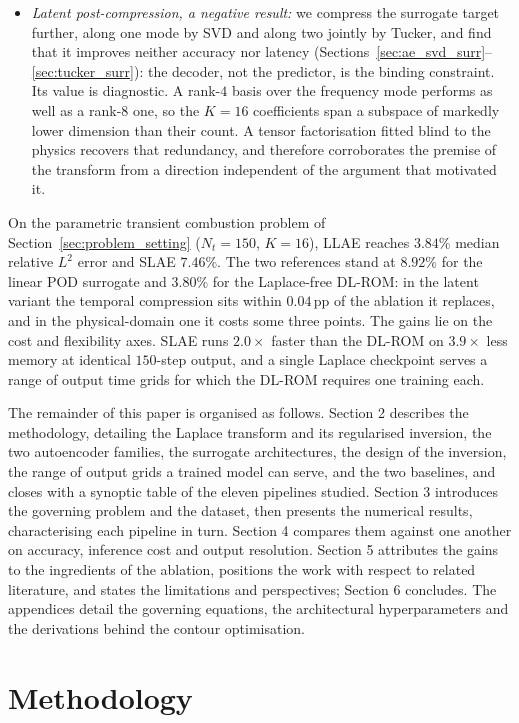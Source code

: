 ﻿\documentclass[a4paper,12pt]{article}
\theoremstyle{definition}
\theoremstyle{remark}
\begin{document}
\begin{itemize}
    \item \emph{Latent post-compression, a negative result:} we compress the surrogate target further, along one mode by SVD and along two jointly by Tucker, and find that it improves neither accuracy nor latency (Sections~\ref{sec:ae_svd_surr}--\ref{sec:tucker_surr}): the decoder, not the predictor, is the binding constraint. Its value is diagnostic. A rank-$4$ basis over the frequency mode performs as well as a rank-$8$ one, so the $K = 16$ coefficients span a subspace of markedly lower dimension than their count. A tensor factorisation fitted blind to the physics recovers that redundancy, and therefore corroborates the premise of the transform from a direction independent of the argument that motivated it.
\end{itemize}

On the parametric transient combustion problem of Section~\ref{sec:problem_setting} ($N_t = 150$, $K = 16$), LLAE reaches $3.84\%$ median relative $L^2$ error and SLAE $7.46\%$. The two references stand at $8.92\%$ for the linear POD surrogate and $3.80\%$ for the Laplace-free DL-ROM: in the latent variant the temporal compression sits within $0.04$\,pp of the ablation it replaces, and in the physical-domain one it costs some three points. The gains lie on the cost and flexibility axes. SLAE runs $2.0\times$ faster than the DL-ROM on $3.9\times$ less memory at identical $150$-step output, and a single Laplace checkpoint serves a range of output time grids for which the DL-ROM requires one training each.

The remainder of this paper is organised as follows. Section 2 describes the methodology, detailing the Laplace transform and its regularised inversion, the two autoencoder families, the surrogate architectures, the design of the inversion, the range of output grids a trained model can serve, and the two baselines, and closes with a synoptic table of the eleven pipelines studied. Section 3 introduces the governing problem and the dataset, then presents the numerical results, characterising each pipeline in turn. Section 4 compares them against one another on accuracy, inference cost and output resolution. Section 5 attributes the gains to the ingredients of the ablation, positions the work with respect to related literature, and states the limitations and perspectives; Section 6 concludes. The appendices detail the governing equations, the architectural hyperparameters and the derivations behind the contour optimisation.

\section{Methodology}
\end{document}
